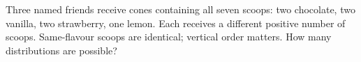 Three named friends receive cones containing all seven scoops: two chocolate, two vanilla, two strawberry, one lemon. Each receives a different positive number of scoops. Same-flavour scoops are identical; vertical order matters. How many distributions are possible?
